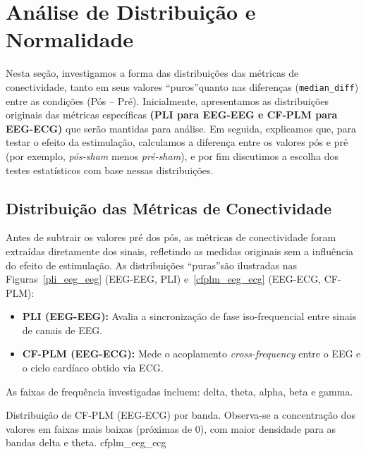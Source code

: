 \chapter{Análise de Distribuição e Normalidade}
\label{chap:analise_distribuicao_normalidade}

Nesta seção, investigamos a forma das distribuições das métricas de conectividade, tanto em seus valores \textquotedblleft puros\textquotedblright quanto nas diferenças (\texttt{median\_diff}) entre as condições (Pós – Pré). Inicialmente, apresentamos as distribuições originais das métricas específicas \textbf{(PLI para EEG-EEG e CF-PLM para EEG-ECG)} que serão mantidas para análise. Em seguida, explicamos que, para testar o efeito da estimulação, calculamos a diferença entre os valores pós e pré (por exemplo, \emph{pós-sham} menos \emph{pré-sham}), e por fim discutimos a escolha dos testes estatísticos com base nessas distribuições.

\section{Distribuição das Métricas de Conectividade}

Antes de subtrair os valores pré dos pós, as métricas de conectividade foram extraídas diretamente dos sinais, refletindo as medidas originais sem a influência do efeito de estimulação. As distribuições \textquotedblleft puras\textquotedblright são ilustradas nas Figuras~\ref{pli_eeg_eeg} (EEG-EEG, PLI) e~\ref{cfplm_eeg_ecg} (EEG-ECG, CF-PLM):
\begin{itemize}
    \item \textbf{PLI (EEG-EEG):} Avalia a sincronização de fase iso-frequencial entre sinais de canais de EEG.
    \item \textbf{CF-PLM (EEG-ECG):} Mede o acoplamento \emph{cross-frequency} entre o EEG e o ciclo cardíaco obtido via ECG.
\end{itemize}

As faixas de frequência investigadas incluem: delta, theta, alpha, beta e gamma.

{Distribuição de CF-PLM (EEG-ECG) por banda. Observa-se a concentração dos valores em faixas mais baixas (próximas de 0), com maior densidade para as bandas delta e theta.}
{cfplm_eeg_ecg}


